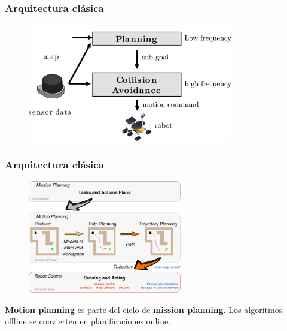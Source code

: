 \begin{frame}
	\frametitle{Arquitectura clásica}
	
	\begin{figure}[!h]
		\includegraphics[width=0.8\textwidth]{images/path_planning_architecture.pdf}
	\end{figure}
	
\end{frame}

\begin{frame}
    \frametitle{Arquitectura clásica}
    
    \begin{figure}[!h]
        \includegraphics[width=0.6\textwidth]{images/motion_planning_architecture.pdf}
    \end{figure}

    {\bf Motion planning} es parte del ciclo de {\bf mission planning}. Los algoritmos offline se convierten en planificaciones online.
    
\end{frame}


